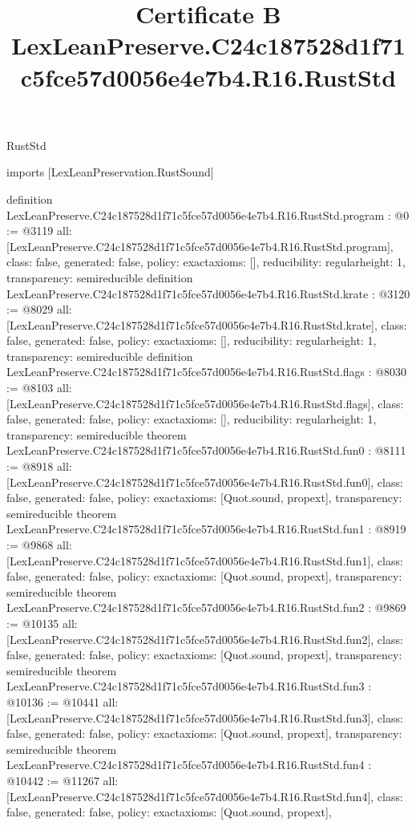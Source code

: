 \begin{lexlean}{RustStd}
\title{Certificate B LexLeanPreserve.C24c187528d1f71c5fce57d0056e4e7b4.R16.RustStd}
\begin{coremodule}
imports [LexLeanPreservation.RustSound]

definition LexLeanPreserve.C24c187528d1f71c5fce57d0056e4e7b4.R16.RustStd.program : @0 := @3119 {
  all: [LexLeanPreserve.C24c187528d1f71c5fce57d0056e4e7b4.R16.RustStd.program],
  class: false,
  generated: false,
  policy: exact{axioms: []},
  reducibility: regular{height: 1},
  transparency: semireducible
}
definition LexLeanPreserve.C24c187528d1f71c5fce57d0056e4e7b4.R16.RustStd.krate : @3120 := @8029 {
  all: [LexLeanPreserve.C24c187528d1f71c5fce57d0056e4e7b4.R16.RustStd.krate],
  class: false,
  generated: false,
  policy: exact{axioms: []},
  reducibility: regular{height: 1},
  transparency: semireducible
}
definition LexLeanPreserve.C24c187528d1f71c5fce57d0056e4e7b4.R16.RustStd.flags : @8030 := @8103 {
  all: [LexLeanPreserve.C24c187528d1f71c5fce57d0056e4e7b4.R16.RustStd.flags],
  class: false,
  generated: false,
  policy: exact{axioms: []},
  reducibility: regular{height: 1},
  transparency: semireducible
}
theorem LexLeanPreserve.C24c187528d1f71c5fce57d0056e4e7b4.R16.RustStd.fun0 : @8111 := @8918 {
  all: [LexLeanPreserve.C24c187528d1f71c5fce57d0056e4e7b4.R16.RustStd.fun0],
  class: false,
  generated: false,
  policy: exact{axioms: [Quot.sound, propext]},
  transparency: semireducible
}
theorem LexLeanPreserve.C24c187528d1f71c5fce57d0056e4e7b4.R16.RustStd.fun1 : @8919 := @9868 {
  all: [LexLeanPreserve.C24c187528d1f71c5fce57d0056e4e7b4.R16.RustStd.fun1],
  class: false,
  generated: false,
  policy: exact{axioms: [Quot.sound, propext]},
  transparency: semireducible
}
theorem LexLeanPreserve.C24c187528d1f71c5fce57d0056e4e7b4.R16.RustStd.fun2 : @9869 := @10135 {
  all: [LexLeanPreserve.C24c187528d1f71c5fce57d0056e4e7b4.R16.RustStd.fun2],
  class: false,
  generated: false,
  policy: exact{axioms: [Quot.sound, propext]},
  transparency: semireducible
}
theorem LexLeanPreserve.C24c187528d1f71c5fce57d0056e4e7b4.R16.RustStd.fun3 : @10136 := @10441 {
  all: [LexLeanPreserve.C24c187528d1f71c5fce57d0056e4e7b4.R16.RustStd.fun3],
  class: false,
  generated: false,
  policy: exact{axioms: [Quot.sound, propext]},
  transparency: semireducible
}
theorem LexLeanPreserve.C24c187528d1f71c5fce57d0056e4e7b4.R16.RustStd.fun4 : @10442 := @11267 {
  all: [LexLeanPreserve.C24c187528d1f71c5fce57d0056e4e7b4.R16.RustStd.fun4],
  class: false,
  generated: false,
  policy: exact{axioms: [Quot.sound, propext]},
}
\end{coremodule}
\end{lexlean}
